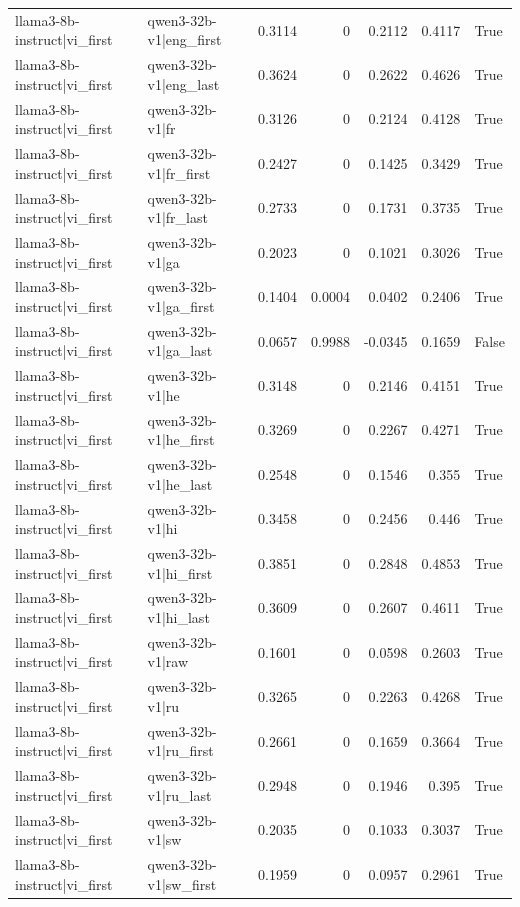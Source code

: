 \begin{table}
\begin{tabular}{l l r r r r l}
llama3-8b-instruct|vi_first & qwen3-32b-v1|eng_first & 0.3114 & 0 & 0.2112 & 0.4117 & True \\
llama3-8b-instruct|vi_first & qwen3-32b-v1|eng_last & 0.3624 & 0 & 0.2622 & 0.4626 & True \\
llama3-8b-instruct|vi_first & qwen3-32b-v1|fr & 0.3126 & 0 & 0.2124 & 0.4128 & True \\
llama3-8b-instruct|vi_first & qwen3-32b-v1|fr_first & 0.2427 & 0 & 0.1425 & 0.3429 & True \\
llama3-8b-instruct|vi_first & qwen3-32b-v1|fr_last & 0.2733 & 0 & 0.1731 & 0.3735 & True \\
llama3-8b-instruct|vi_first & qwen3-32b-v1|ga & 0.2023 & 0 & 0.1021 & 0.3026 & True \\
llama3-8b-instruct|vi_first & qwen3-32b-v1|ga_first & 0.1404 & 0.0004 & 0.0402 & 0.2406 & True \\
llama3-8b-instruct|vi_first & qwen3-32b-v1|ga_last & 0.0657 & 0.9988 & -0.0345 & 0.1659 & False \\
llama3-8b-instruct|vi_first & qwen3-32b-v1|he & 0.3148 & 0 & 0.2146 & 0.4151 & True \\
llama3-8b-instruct|vi_first & qwen3-32b-v1|he_first & 0.3269 & 0 & 0.2267 & 0.4271 & True \\
llama3-8b-instruct|vi_first & qwen3-32b-v1|he_last & 0.2548 & 0 & 0.1546 & 0.355 & True \\
llama3-8b-instruct|vi_first & qwen3-32b-v1|hi & 0.3458 & 0 & 0.2456 & 0.446 & True \\
llama3-8b-instruct|vi_first & qwen3-32b-v1|hi_first & 0.3851 & 0 & 0.2848 & 0.4853 & True \\
llama3-8b-instruct|vi_first & qwen3-32b-v1|hi_last & 0.3609 & 0 & 0.2607 & 0.4611 & True \\
llama3-8b-instruct|vi_first & qwen3-32b-v1|raw & 0.1601 & 0 & 0.0598 & 0.2603 & True \\
llama3-8b-instruct|vi_first & qwen3-32b-v1|ru & 0.3265 & 0 & 0.2263 & 0.4268 & True \\
llama3-8b-instruct|vi_first & qwen3-32b-v1|ru_first & 0.2661 & 0 & 0.1659 & 0.3664 & True \\
llama3-8b-instruct|vi_first & qwen3-32b-v1|ru_last & 0.2948 & 0 & 0.1946 & 0.395 & True \\
llama3-8b-instruct|vi_first & qwen3-32b-v1|sw & 0.2035 & 0 & 0.1033 & 0.3037 & True \\
llama3-8b-instruct|vi_first & qwen3-32b-v1|sw_first & 0.1959 & 0 & 0.0957 & 0.2961 & True \\

\end{tabular}
\end{table}
